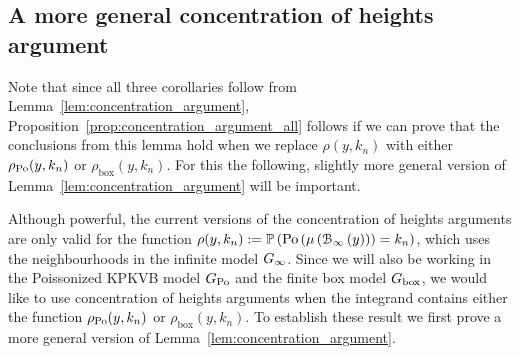 %
%
%

\subsection{A more general concentration of heights argument}\label{ssec:general_concentration_lemma}

Note that since all three corollaries follow from Lemma~\ref{lem:concentration_argument}, Proposition~\ref{prop:concentration_argument_all} follows if we can prove that the conclusions from this lemma hold when we replace $\rho(y,k_n)$ with either $\rho_{{\mathrm{Po}}}(y,k_n)$ or $\rho_{\text{box}}(y,k_n)$. For this the following, slightly more general version of Lemma~\ref{lem:concentration_argument} will be important.

Although powerful, the current versions of the concentration of heights arguments are only valid for the function $\rho(y,k_n) := \mathbb{P}\left({\mathrm{Po}}\left(\mu\left({\mathcal B}_{\infty}\left(y\right)\right)\right) = k_n\right)$, which uses the neighbourhoods in the infinite model $G_{\infty}$. Since we will also be working in the Poissonized KPKVB model $G_{{\mathrm{Po}}}$ and the finite box model $G_{\mathrm{box}}$, we would like to use concentration of heights arguments when the integrand contains either the function $\rho_{{\mathrm{Po}}}(y,k_n)$ or $\rho_{\text{box}}(y,k_n)$. To establish these result we first prove a more general version of Lemma~\ref{lem:concentration_argument}.


